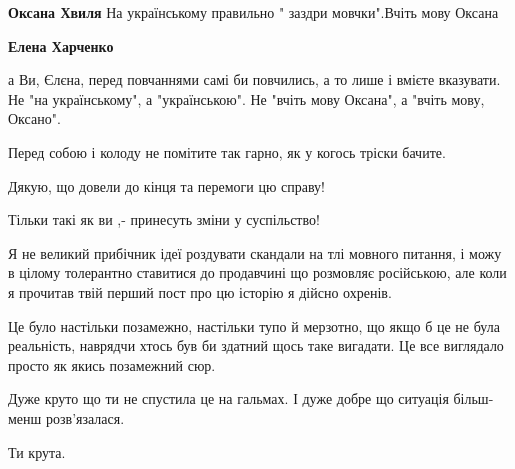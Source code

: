 \begin{itemize}
\begin{itemize}
\textbf{Оксана Хвиля} На українському правильно " заздри мовчки".Вчіть мову Оксана

 
\textbf{Елена Харченко} 

а Ви, Єлєна, перед повчаннями самі би повчились, а то лише і вмієте вказувати.
Не "на українському", а "українською". Не "вчіть мову Оксана", а "вчіть мову,
Оксано".

Перед собою і колоду не помітите так гарно, як у когось тріски бачите.
\end{itemize}

 
Дякую, що довели до кінця та перемоги цю справу!

Тільки такі як ви ,- принесуть зміни у суспільство!

 

Я не великий прибічник ідеї роздувати скандали на тлі мовного питання, і можу в
цілому толерантно ставитися до продавчині що розмовляє російською, але коли я
прочитав твій перший пост про цю історію я дійсно охренів.

Це було настільки позамежно, настільки тупо й мерзотно, що якщо б це не була
реальність, наврядчи хтось був би здатний щось таке вигадати. Це все виглядало
просто як якись позамежний сюр.

Дуже круто що ти не спустила це на гальмах. І дуже добре що ситуація більш-менш
розв’язалася.

Ти крута.

\begin{itemize}
 

\end{itemize}
\end{itemize}
